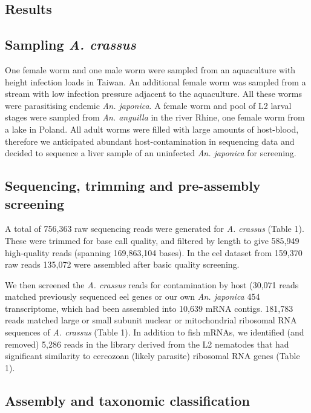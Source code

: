 \documentclass[10pt]{bmc_article}
\newenvironment{bmcformat}{\begin{raggedright}\baselineskip20pt\sloppy\setboolean{publ}{false}}{\end{raggedright}\baselineskip20pt\sloppy}
\begin{document}
\begin{bmcformat}
\section*{Results}


\subsection*{Sampling \textit{A. crassus}}

One female worm and one male worm were sampled from an aquaculture
with height infection loads in Taiwan. An additional female worm was
sampled from a stream with low infection pressure adjacent to the
aquaculture. All these worms were parasitising endemic
\textit{An. japonica}. A female worm and pool of L2 larval stages were
sampled from \textit{An. anguilla} in the river Rhine, one female worm
from a lake in Poland. All adult worms were filled with large amounts
of host-blood, therefore we anticipated abundant host-contamination in
sequencing data and decided to sequence a liver sample of an uninfected
\textit{An. japonica} for screening.

 \subsection*{Sequencing, trimming and pre-assembly screening}






A total of 756,363 raw sequencing reads were
generated for \textit{A. crassus} (Table 1). These were trimmed for
base call quality, and filtered by length to give
585,949 high-quality reads (spanning
169,863,104 bases). In the eel dataset from
159,370 raw reads 135,072 were
assembled after basic quality screening.

We then screened the \textit{A. crassus} reads for contamination by
host (30,071 reads matched
previously sequenced eel genes or our own \textit{An. japonica} 454
transcriptome, which had been assembled into
10,639 mRNA
contigs. 181,783 reads matched large
or small subunit nuclear or mitochondrial ribosomal RNA sequences of
\textit{A. crassus} (Table 1). In addition to fish mRNAs, we
identified (and removed) 5,286
reads in the library derived from the L2 nematodes that had
significant similarity to cercozoan (likely parasite) ribosomal RNA
genes (Table 1).

\subsection*{Assembly and taxonomic classification}



\end{bmcformat}
\end{document}
